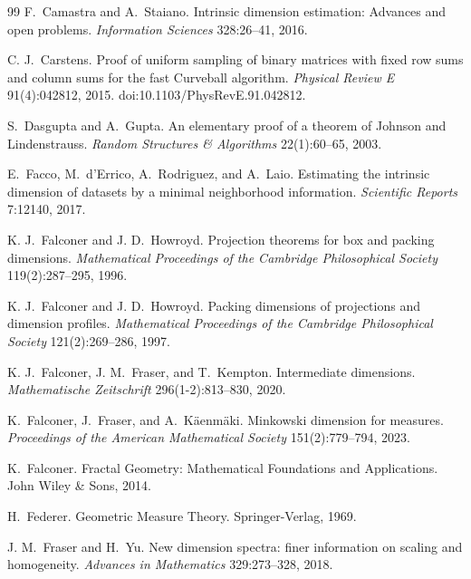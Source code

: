 \documentclass[11pt,a4paper]{article}
\theoremstyle{plain}
\theoremstyle{remark}
\begin{document}
\begin{thebibliography}{99}
 F.~Camastra and A.~Staiano. Intrinsic dimension estimation: Advances and open problems. \emph{Information Sciences} 328:26--41, 2016.

 C. J.~Carstens. Proof of uniform sampling of binary matrices with fixed row sums and column sums for the fast Curveball algorithm. \emph{Physical Review E} 91(4):042812, 2015. doi:10.1103/PhysRevE.91.042812.

 S.~Dasgupta and A.~Gupta. An elementary proof of a theorem of {J}ohnson and {L}indenstrauss. \emph{Random Structures \& Algorithms} 22(1):60--65, 2003.

 E.~Facco, M.~d'Errico, A.~Rodriguez, and A.~Laio. Estimating the intrinsic dimension of datasets by a minimal neighborhood information. \emph{Scientific Reports} 7:12140, 2017.

 K. J.~Falconer and J. D.~Howroyd. Projection theorems for box and packing dimensions. \emph{Mathematical Proceedings of the Cambridge Philosophical Society} 119(2):287--295, 1996.

 K. J.~Falconer and J. D.~Howroyd. Packing dimensions of projections and dimension profiles. \emph{Mathematical Proceedings of the Cambridge Philosophical Society} 121(2):269--286, 1997.

 K. J.~Falconer, J. M.~Fraser, and T.~Kempton. Intermediate dimensions. \emph{Mathematische Zeitschrift} 296(1-2):813--830, 2020.

 K.~Falconer, J.~Fraser, and A.~K\"aenm\"aki. Minkowski dimension for measures. \emph{Proceedings of the American Mathematical Society} 151(2):779--794, 2023.

 K.~Falconer. Fractal Geometry: Mathematical Foundations and Applications. John Wiley \& Sons, 2014.

 H.~Federer. Geometric Measure Theory. Springer-Verlag, 1969.

 J. M.~Fraser and H.~Yu. New dimension spectra: finer information on scaling and homogeneity. \emph{Advances in Mathematics} 329:273--328, 2018.


\end{thebibliography}
\end{document}
